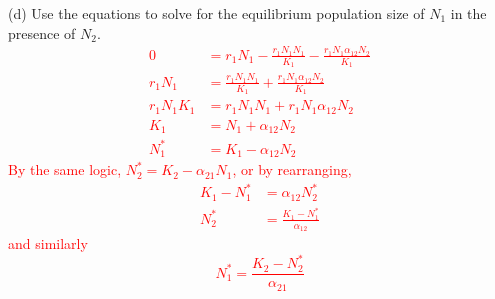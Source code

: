 \documentclass{article}
\begin{document}
(d) Use the equations to solve for the equilibrium population size of $N_1$ in the presence of $N_2$. 
\textcolor{red}{
\begin{align*}
		0 & = r_1 N_1 - \frac{r_1 N_1 N_1}{K_1} - \frac{r_1  N_1 \alpha_{12} 
		N_2}{K_1}\\
	r_1 N_1 & = \frac{r_1 N_1 N_1}{K_1} + \frac{r_1  N_1 \alpha_{12}  
	N_2}{K_1}\\
	r_1 N_1 K_1 &= r_1 N_1 N_1 + r_1  N_1 \alpha_{12} N_2\\
	K_1 &= N_1 + \alpha_{12} N_2\\
	N_1^* &= K_1 - \alpha_{12} N_2
\end{align*}
By the same logic, 	$N_2^* = K_2 - \alpha_{21} N_1$, or by rearranging,
\begin{align*}
	K_1 - N_1^* &= \alpha_{12} N_2^*\\
	N_2^* &= \frac{K_1 - N_1^*}{\alpha_{12}}
\end{align*}
and similarly
\begin{equation*}
	N_1^* = \frac{K_2 - N_2^*}{\alpha_{21}}
\end{equation*}
}
\end{document}
